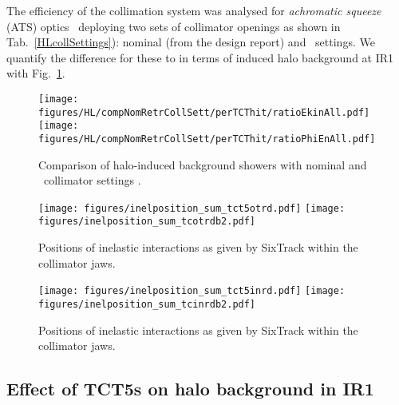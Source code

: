 The efficiency of the collimation system was analysed for \textit{achromatic squeeze} (ATS) optics~\cite{ATSref} deploying two sets of collimator openings as shown in Tab.~\ref{HLcollSettings}): nominal (from the design report) and \twosigmaret~settings. We quantify the difference for these to in terms of induced halo background at IR1 with Fig.~\ref{fig:compNomRetrSett}.

\begin{figure}
\begin{center}
\texttt{[image: figures/HL/compNomRetrCollSett/perTCThit/ratioEkinAll.pdf]}
\texttt{[image: figures/HL/compNomRetrCollSett/perTCThit/ratioPhiEnAll.pdf]}
\end{center}
\vspace{-0.6cm}
 \caption{Comparison of halo-induced background showers with nominal and \twosigmaret~collimator settings .
  \label{fig:compNomRetrSett}}
\end{figure}


\begin{figure}%
\begin{center}
\texttt{[image: figures/inelposition\_sum\_tct5otrd.pdf]}
\texttt{[image: figures/inelposition\_sum\_tcotrdb2.pdf]}

\end{center}
\vspace{-0.6cm}
 \caption{Positions of inelastic interactions as given by SixTrack within the collimator jaws.
  \label{inelHLtct5in}}
\end{figure}


\begin{figure}[!htb]
\begin{center}
\texttt{[image: figures/inelposition\_sum\_tct5inrd.pdf]}
\texttt{[image: figures/inelposition\_sum\_tcinrdb2.pdf]}
\end{center}
\vspace{-0.6cm}
 \caption{Positions of inelastic interactions as given by SixTrack within the collimator jaws.
  \label{inelHLtct5in}}
\end{figure}



\subsection{Effect of TCT5s on halo background in IR1}

